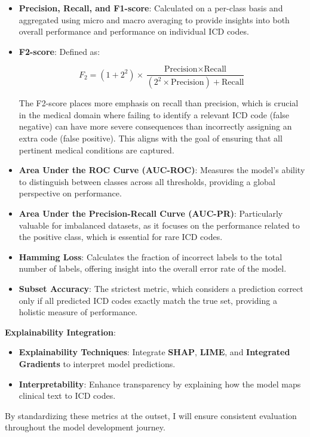 \documentclass[10pt,a4paper]{article}
\begin{document}
\begin{itemize}
    \item \textbf{Precision, Recall, and F1-score}: Calculated on a per-class basis and aggregated using micro and macro averaging to provide insights into both overall performance and performance on individual ICD codes.
    \item \textbf{F2-score}: Defined as:

    \[
    F_{2} = (1 + 2^2) \times \frac{\text{Precision} \times \text{Recall}}{(2^2 \times \text{Precision}) + \text{Recall}}
    \]

    The F2-score places more emphasis on recall than precision, which is crucial in the medical domain where failing to identify a relevant ICD code (false negative) can have more severe consequences than incorrectly assigning an extra code (false positive). This aligns with the goal of ensuring that all pertinent medical conditions are captured.
    \item \textbf{Area Under the ROC Curve (AUC-ROC)}: Measures the model's ability to distinguish between classes across all thresholds, providing a global perspective on performance.
    \item \textbf{Area Under the Precision-Recall Curve (AUC-PR)}: Particularly valuable for imbalanced datasets, as it focuses on the performance related to the positive class, which is essential for rare ICD codes.
    \item \textbf{Hamming Loss}: Calculates the fraction of incorrect labels to the total number of labels, offering insight into the overall error rate of the model.
    \item \textbf{Subset Accuracy}: The strictest metric, which considers a prediction correct only if all predicted ICD codes exactly match the true set, providing a holistic measure of performance.
\end{itemize}

\textbf{Explainability Integration}:
\begin{itemize}
    \item \textbf{Explainability Techniques}: Integrate \textbf{SHAP}, \textbf{LIME}, and \textbf{Integrated Gradients} to interpret model predictions.
    \item \textbf{Interpretability}: Enhance transparency by explaining how the model maps clinical text to ICD codes.
\end{itemize}

By standardizing these metrics at the outset, I will ensure consistent evaluation throughout the model development journey.
\end{document}
